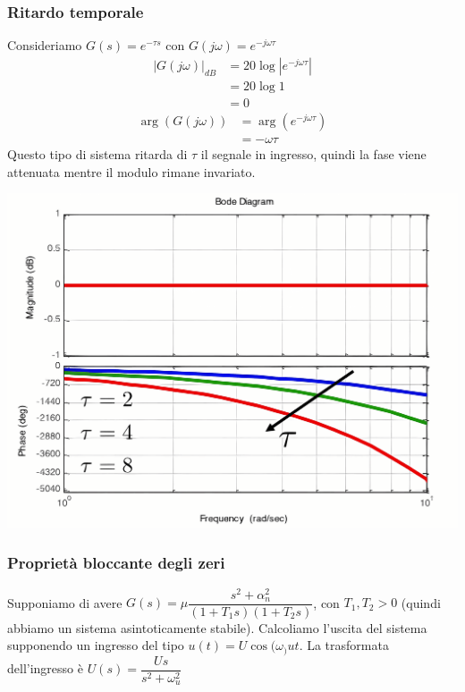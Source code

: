 \documentclass{article}
\numberwithin{equation}{subsection}
\begin{document}
\subsubsection{Ritardo temporale}
Consideriamo $G(s) = e^{-\tau s}$ con $G(j\omega) = e^{-j \omega\tau }$
\begin{align*}
    |G(j\omega)|_{dB} &= 20 \log |e^{-j \omega\tau}|\\
    &= 20 \log 1\\
    &=0
\end{align*}
\begin{align*}
    \arg(G(j\omega)) &= \arg(e^{-j\omega\tau})\\
    &= - \omega\tau
\end{align*}
Questo tipo di sistema ritarda di $\tau$ il segnale in ingresso, quindi la fase viene attenuata mentre il modulo rimane invariato.
\begin{center}
    \includegraphics[scale=0.15]{Images/Diagramma_rit_temp.png}
\end{center}


\subsubsection{Proprietà bloccante degli zeri}
Supponiamo di avere $G(s) = \mu\dfrac{s^2+\alpha_n^2}{(1+T_1 s)(1+T_2 s)}$, con $T_1,T_2 > 0$ (quindi abbiamo un sistema asintoticamente stabile). Calcoliamo l'uscita del sistema supponendo un ingresso del tipo $u(t) = U \cos(\omega_)u t$. La trasformata dell'ingresso è $U(s) = \dfrac{U s}{s^2 + \omega_u^2}$
\end{document}
